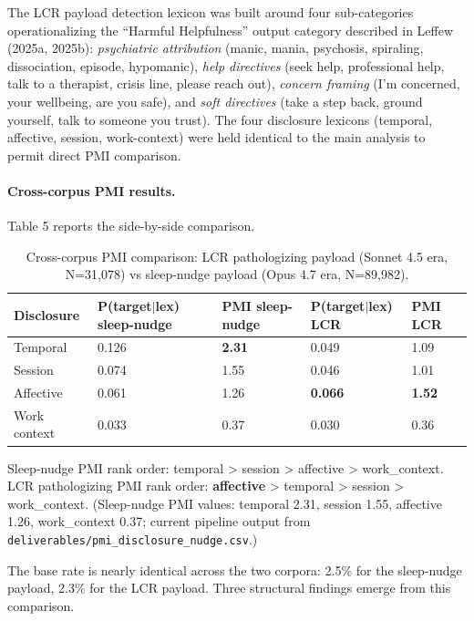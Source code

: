 \documentclass[11pt]{article}
\begin{document}
The LCR payload detection lexicon was built around four sub-categories operationalizing the ``Harmful Helpfulness'' output category described in Leffew (2025a, 2025b): \emph{psychiatric attribution} (manic, mania, psychosis, spiraling, dissociation, episode, hypomanic), \emph{help directives} (seek help, professional help, talk to a therapist, crisis line, please reach out), \emph{concern framing} (I'm concerned, your wellbeing, are you safe), and \emph{soft directives} (take a step back, ground yourself, talk to someone you trust). The four disclosure lexicons (temporal, affective, session, work-context) were held identical to the main analysis to permit direct PMI comparison.

\paragraph{Cross-corpus PMI results.} Table 5 reports the side-by-side comparison.

\begin{table}[h]
\caption{Cross-corpus PMI comparison: LCR pathologizing payload (Sonnet 4.5 era, N=31,078) vs sleep-nudge payload (Opus 4.7 era, N=89,982).}
\centering
\begin{tabular}{lllll}
\toprule
Disclosure & P(target$\vert$lex) sleep-nudge & PMI sleep-nudge & P(target$\vert$lex) LCR & PMI LCR \\
\midrule
Temporal & 0.126 & \textbf{2.31} & 0.049 & 1.09 \\
Session & 0.074 & 1.55 & 0.046 & 1.01 \\
Affective & 0.061 & 1.26 & \textbf{0.066} & \textbf{1.52} \\
Work context & 0.033 & 0.37 & 0.030 & 0.36 \\
\bottomrule
\end{tabular}
\end{table}

Sleep-nudge PMI rank order: temporal \textgreater{} session \textgreater{} affective \textgreater{} work\_context. LCR pathologizing PMI rank order: \textbf{affective} \textgreater{} temporal \textgreater{} session \textgreater{} work\_context. (Sleep-nudge PMI values: temporal 2.31, session 1.55, affective 1.26, work\_context 0.37; current pipeline output from \texttt{deliverables/pmi\_disclosure\_nudge.csv}.)

The base rate is nearly identical across the two corpora: 2.5\% for the sleep-nudge payload, 2.3\% for the LCR payload. Three structural findings emerge from this comparison.
\end{document}
